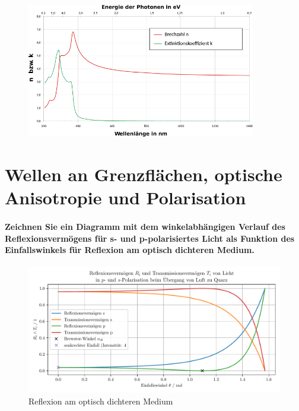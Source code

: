 \documentclass[a4paper, 11pt, ngerman, parskip=half]{scrartcl}
\begin{document}
\begin{figure}[H]
    \centering
    \includegraphics[width=10cm]{image/14/6}
\end{figure}

\newpage

\section{Wellen an Grenzflächen, optische Anisotropie und Polarisation}
\label{Wellen an Grenzflaechen, optische Anisotropie und Polarisation}

\paragraph{Zeichnen Sie ein Diagramm mit dem winkelabhängigen Verlauf des Reflexionsvermögens für s-
und p-polarisiertes Licht als Funktion des Einfallswinkels für Reflexion am optisch dichteren
Medium.}
\phantom{}  %
\begin{figure}[H]
    \centering
    \begin{samepage}
        \includegraphics[width=\textwidth]{image/15/Luft_zu_Quarz.pdf}
        \caption{Reflexion am optisch dichteren Medium}
        \label{fig:reflexion_dicht}
    \end{samepage}
\end{figure}
\end{document}
